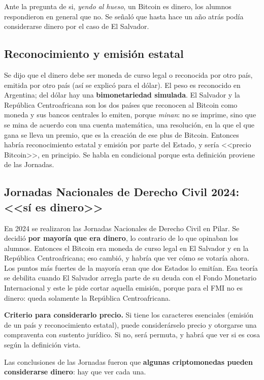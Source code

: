 \documentclass[12pt,oneside,a4paper]{book}
\begin{document}
Ante la pregunta de si, \emph{yendo al hueso}, un Bitcoin es dinero, los alumnos respondieron en general que no. Se señaló que hasta hace un año atrás podía considerarse dinero por el caso de El Salvador.

\subsection{Reconocimiento y emisión estatal}

Se dijo que el dinero debe ser moneda de curso legal o reconocida por otro país, emitida por otro país (así se explicó para el dólar). El peso es reconocido en Argentina; del dólar hay una \textbf{bimonetariedad simulada}. El Salvador y la República Centroafricana son los dos países que reconocen al Bitcoin como moneda y sus bancos centrales lo emiten, porque \emph{minan}: no se imprime, sino que se mina de acuerdo con una cuenta matemática, una resolución, en la que el que gana se lleva un premio, que es la creación de ese plus de Bitcoin. Entonces habría reconocimiento estatal y emisión por parte del Estado, y sería <<precio Bitcoin>>, en principio. Se habla en condicional porque esta definición proviene de las Jornadas.

\subsection{Jornadas Nacionales de Derecho Civil 2024: <<sí es dinero>>}

En 2024 se realizaron las Jornadas Nacionales de Derecho Civil en Pilar. Se decidió \textbf{por mayoría que era dinero}, lo contrario de lo que opinaban los alumnos. Entonces el Bitcoin era moneda de curso legal en El Salvador y en la República Centroafricana; eso cambió, y habría que ver cómo se votaría ahora. Los puntos más fuertes de la mayoría eran que dos Estados lo emitían. Esa teoría se debilita cuando El Salvador arregla parte de su deuda con el Fondo Monetario Internacional y este le pide cortar aquella emisión, porque para el FMI no es dinero: queda solamente la República Centroafricana.

\begin{important}
\textbf{Criterio para considerarlo precio.} Si tiene los caracteres esenciales (emisión de un país y reconocimiento estatal), puede considerárselo precio y otorgarse una compraventa con sustento jurídico. Si no, será permuta, y habrá que ver si es cosa según la definición vista.

Las conclusiones de las Jornadas fueron que \textbf{algunas criptomonedas pueden considerarse dinero}: hay que ver cada una.
\end{important}
\end{document}
